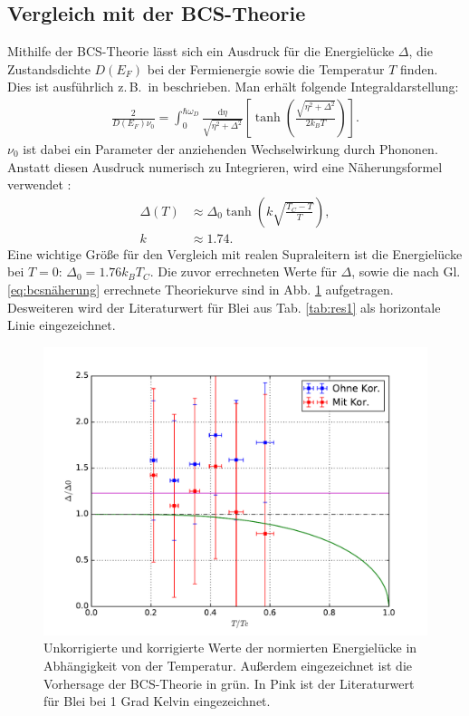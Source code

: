 \documentclass[twoside,        %
               BCOR12mm,       %
               english,ngerman, %
               fleqn,headsepline=false,footsepline=false
              ]{Vorlage/MFPREPORT}
\renewcommand{\d}{\ensuremath{\mathrm{d}}} %
\newcommand{\zB}{z.\,B.\ }
\begin{document}
\subsection{Vergleich mit der BCS-Theorie}
Mithilfe der BCS-Theorie lässt sich ein Ausdruck für die Energielücke $\Delta$,
die Zustandsdichte $D(E_F)$ bei der Fermienergie sowie die Temperatur $T$
finden. Dies ist ausführlich \zB in \cite{enss2011tieftemperaturphysik}
beschrieben. Man erhält folgende Integraldarstellung:
\begin{align}
    \label{eq:bcsint}
    \frac{2}{D(E_F)\nu_0}=\int_0^{\hbar \omega_D}\frac{\d
    \eta}{\sqrt{\eta^2+\Delta^2}}\left[
    \tanh\left({\frac{\sqrt{\eta^2+\Delta^2}}{2k_BT}}\right) \right].
\end{align}
$\nu_0$ ist dabei ein Parameter der anziehenden Wechselwirkung durch Phononen.
Anstatt diesen Ausdruck numerisch zu Integrieren, wird eine Näherungsformel
verwendet \cite{senapati2011spin}:
\begin{align}
    \label{eq:bcsnäherung}
    \Delta(T)&\approx\Delta_0\tanh\left(k\sqrt{\frac{T_C-T}{T}}\right),\\
    k&\approx1.74.
\end{align}
Eine wichtige Größe für den Vergleich mit realen Supraleitern ist die
Energielücke bei $T=0$: $\Delta_0=1.76k_BT_C$.
Die zuvor errechneten Werte für $\Delta$, sowie die nach Gl.
\ref{eq:bcsnäherung} errechnete Theoriekurve sind in Abb. \ref{fig:4}
aufgetragen. Desweiteren wird der Literaturwert für Blei aus Tab.
\ref{tab:res1} als horizontale Linie eingezeichnet.

\begin{figure}[]
    \centering
    \includegraphics[width=\textwidth]{fig/4.pdf}
    \caption{Unkorrigierte und korrigierte Werte der normierten Energielücke in
    Abhängigkeit von der Temperatur. Außerdem eingezeichnet ist die Vorhersage
    der BCS-Theorie in grün. In Pink ist der Literaturwert für Blei bei 1 Grad
    Kelvin eingezeichnet.}
    \label{fig:4}
\end{figure}
\newpage
\end{document}
